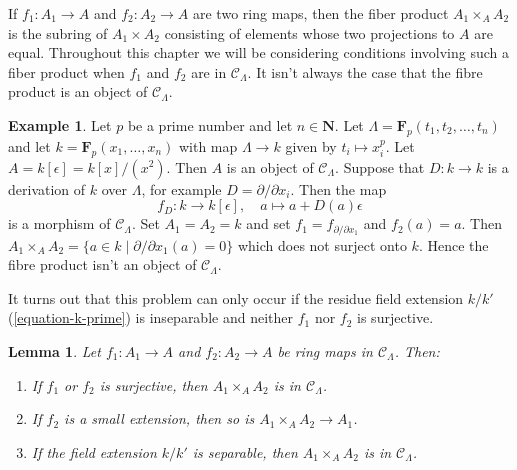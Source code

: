 \documentclass{stacks-project}
\theoremstyle{plain}
\newtheorem{lemma}[subsection]{Lemma}
\theoremstyle{definition}
\newtheorem{example}[subsection]{Example}
\theoremstyle{remark}
\numberwithin{equation}{subsection}
\begin{document}
\noindent
If $f_1: A_1 \to A$ and $f_2: A_2 \to A$ are two ring maps, then the fiber
product $A_1 \times_A A_2$ is the subring of $A_1 \times A_2$ consisting of
elements whose two projections to $A$ are equal. Throughout this chapter we
will be considering conditions involving such a fiber product when $f_1$
and $f_2$ are in $\mathcal{C}_\Lambda$. It isn't always the case that the
fibre product is an object of $\mathcal{C}_\Lambda$.

\begin{example}
\label{example-fibre-product}
Let $p$ be a prime number and let $n \in \mathbf{N}$.
Let $\Lambda = \mathbf{F}_p(t_1, t_2, \ldots, t_n)$ and let
$k = \mathbf{F}_p(x_1, \ldots, x_n)$ with map $\Lambda \to k$ given
by $t_i \mapsto x_i^p$. Let $A = k[\epsilon] = k[x]/(x^2)$.
Then $A$ is an object of $\mathcal{C}_\Lambda$. Suppose that
$D : k \to k$ is a derivation of $k$ over $\Lambda$, for example
$D = \partial/\partial x_i$. Then the map
$$
f_D : k \longrightarrow k[\epsilon], \quad
a \mapsto a + D(a)\epsilon
$$
is a morphism of $\mathcal{C}_\Lambda$. Set $A_1 = A_2 = k$ and set
$f_1 = f_{\partial/\partial x_1}$ and $f_2(a) = a$. Then
$A_1 \times_A A_2 = \{a \in k \mid \partial/\partial x_1(a) = 0\}$
which does not surject onto $k$. Hence the fibre product isn't
an object of $\mathcal{C}_\Lambda$.
\end{example}

\noindent
It turns out that this problem can only occur if the residue field
extension $k/k'$ (\ref{equation-k-prime}) is inseparable
and neither $f_1$ nor $f_2$ is surjective.

\begin{lemma}
\label{lemma-fiber-product-CLambda}
Let $f_1 : A_1 \to A$ and $f_2 : A_2 \to A$ be ring maps in
$\mathcal{C}_\Lambda$. Then:
\begin{enumerate}
\item If $f_1$ or $f_2$ is surjective, then
$A_1 \times_A A_2$ is in $\mathcal{C}_\Lambda$.
\item If $f_2$ is a small extension, then so is
$A_1 \times_A A_2 \to A_1$.
\item If the field extension $k/k'$ is separable, then
$A_1 \times_A A_2$ is in $\mathcal{C}_\Lambda$.
\end{enumerate}
\end{lemma}
\end{document}
